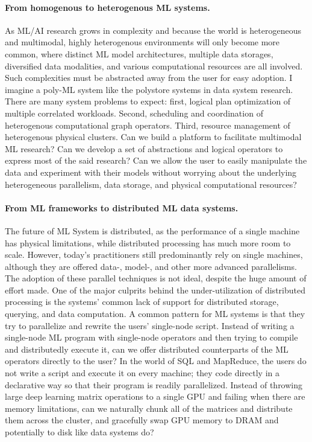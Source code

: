 \documentclass[letterpaper]{article}
\begin{document}
\paragraph{From homogenous to heterogenous ML systems.} As ML/AI research grows in complexity and because the world is heterogeneous and multimodal, highly heterogenous environments will only become more common, where distinct ML model architectures, multiple data storages, diversified data modalities, and various computational resources are all involved. Such complexities must be abstracted away from the user for easy adoption. I imagine a poly-ML system like the polystore systems in data system research. There are many system problems to expect: first, logical plan optimization of multiple correlated workloads. Second, scheduling and coordination of heterogenous computational graph operators. Third, resource management of heterogenous physical clusters. Can we build a platform to facilitate multimodal ML research? Can we develop a set of abstractions and logical operators to express most of the said research? Can we allow the user to easily manipulate the data and experiment with their models without worrying about the underlying heterogeneous parallelism, data storage, and physical computational resources? 

\paragraph{From ML frameworks to distributed ML data systems.} The future of ML System is distributed, as the performance of a single machine has physical limitations, while distributed processing has much more room to scale. However, today's practitioners still predominantly rely on single machines, although they are offered data-, model-, and other more advanced parallelisms. The adoption of these parallel techniques is not ideal, despite the huge amount of effort made. One of the major culprits behind the under-utilization of distributed processing is the systems' common lack of support for distributed storage, querying, and data computation. A common pattern for ML systems is that they try to parallelize and rewrite the users' single-node script. Instead of writing a single-node ML program with single-node operators and then trying to compile and distributedly execute it, can we offer distributed counterparts of the ML operators directly to the user? In the world of SQL and MapReduce, the users do not write a script and execute it on every machine; they code directly in a declarative way so that their program is readily parallelized. Instead of throwing large deep learning matrix operations to a single GPU and failing when there are memory limitations, can we naturally chunk all of the matrices and distribute them across the cluster, and gracefully swap GPU memory to DRAM and potentially to disk like data systems do? 
\end{document}

